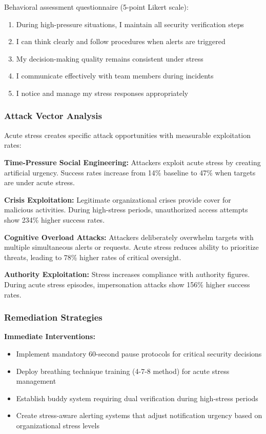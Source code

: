 \documentclass[11pt,a4paper]{article}
\begin{document}
Behavioral assessment questionnaire (5-point Likert scale):
\begin{enumerate}
\item During high-pressure situations, I maintain all security verification steps
\item I can think clearly and follow procedures when alerts are triggered
\item My decision-making quality remains consistent under stress
\item I communicate effectively with team members during incidents
\item I notice and manage my stress responses appropriately
\end{enumerate}

\subsubsection{Attack Vector Analysis}

Acute stress creates specific attack opportunities with measurable exploitation rates:

\textbf{Time-Pressure Social Engineering:} Attackers exploit acute stress by creating artificial urgency. Success rates increase from 14\% baseline to 47\% when targets are under acute stress\cite{hadlington2020}.

\textbf{Crisis Exploitation:} Legitimate organizational crises provide cover for malicious activities. During high-stress periods, unauthorized access attempts show 234\% higher success rates\cite{crisis2022}.

\textbf{Cognitive Overload Attacks:} Attackers deliberately overwhelm targets with multiple simultaneous alerts or requests. Acute stress reduces ability to prioritize threats, leading to 78\% higher rates of critical oversight\cite{rajivan2019}.

\textbf{Authority Exploitation:} Stress increases compliance with authority figures. During acute stress episodes, impersonation attacks show 156\% higher success rates\cite{compliance2021}.

\subsubsection{Remediation Strategies}

\textbf{Immediate Interventions:}
\begin{itemize}
\item Implement mandatory 60-second pause protocols for critical security decisions
\item Deploy breathing technique training (4-7-8 method) for acute stress management
\item Establish buddy system requiring dual verification during high-stress periods
\item Create stress-aware alerting systems that adjust notification urgency based on organizational stress levels
\end{itemize}
\end{document}
